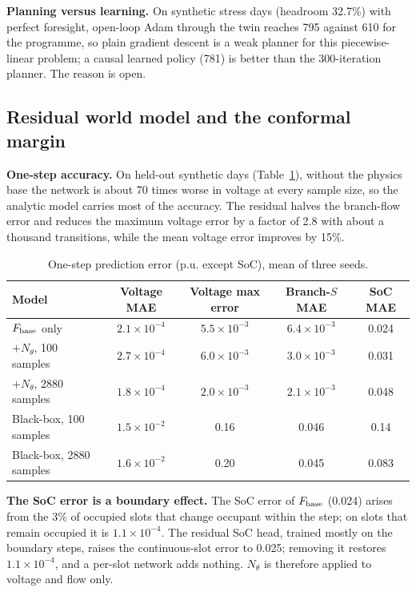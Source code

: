 \documentclass[11pt]{article}
\begin{document}
\textbf{Planning versus learning.} On synthetic stress days (headroom 32.7\%) with perfect foresight, open-loop Adam through the twin reaches 795 against 610 for the programme, so plain gradient descent is a weak planner for this piecewise-linear problem; a causal learned policy (781) is better than the 300-iteration planner. The reason is open.

\subsection{Residual world model and the conformal margin}\label{sec:wm}
\textbf{One-step accuracy.} On held-out synthetic days (Table~\ref{tab:wm}), without the physics base the network is about 70 times worse in voltage at every sample size, so the analytic model carries most of the accuracy. The residual halves the branch-flow error and reduces the maximum voltage error by a factor of 2.8 with about a thousand transitions, while the mean voltage error improves by 15\%.
\begin{table}[h]\centering\small
\begin{tabular}{@{}lcccc@{}}\toprule Model & Voltage MAE & Voltage max error & Branch-$S$ MAE & SoC MAE\\\midrule
$F_{\rm base}$ only & $2.1\times10^{-4}$ & $5.5\times10^{-3}$ & $6.4\times10^{-3}$ & 0.024\\
$+N_\theta$, 100 samples & $2.7\times10^{-4}$ & $6.0\times10^{-3}$ & $3.0\times10^{-3}$ & 0.031\\
$+N_\theta$, 2880 samples & $1.8\times10^{-4}$ & $2.0\times10^{-3}$ & $2.1\times10^{-3}$ & 0.048\\
Black-box, 100 samples & $1.5\times10^{-2}$ & 0.16 & 0.046 & 0.14\\
Black-box, 2880 samples & $1.6\times10^{-2}$ & 0.20 & 0.045 & 0.083\\\bottomrule
\end{tabular}\caption{One-step prediction error (p.u. except SoC), mean of three seeds.}\label{tab:wm}\end{table}

\textbf{The SoC error is a boundary effect.} The SoC error of $F_{\rm base}$ (0.024) arises from the 3\% of occupied slots that change occupant within the step; on slots that remain occupied it is $1.1\times10^{-4}$. The residual SoC head, trained mostly on the boundary steps, raises the continuous-slot error to 0.025; removing it restores $1.1\times10^{-4}$, and a per-slot network adds nothing. $N_\theta$ is therefore applied to voltage and flow only.
\end{document}
